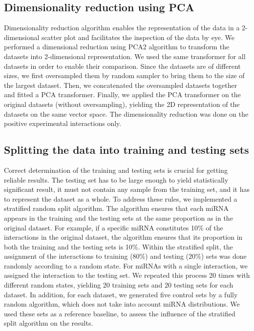 \documentclass{bmcart}
\begin{document}
\subsection*{Dimensionality reduction using PCA}
Dimensionality reduction algorithm enables the representation of the data in a 2-dimensional scatter plot and facilitates the inspection of the data by eye. We performed a dimensional reduction using PCA2 algorithm to transform the datasets into 2-dimensional representation. 
We used the same transformer for all datasets in order to enable their comparison. 
Since the datasets are of different sizes, we first oversampled them by random sampler to bring them to the size of the largest dataset. Then, we concatenated the oversampled datasets together and fitted a PCA transformer. Finally, we applied the PCA transformer on the original datasets (without oversampling), yielding the 2D representation of the datasets on the same vector space. 
The dimensionality reduction was done on the positive experimental interactions only.

\subsection*{Splitting the data into training and testing sets} \label{method:split}
Correct determination of the training and testing sets is crucial for getting reliable results. The testing set has to be large enough to yield statistically significant result, it must not contain any sample from the training set, and it has to represent the dataset as a whole. 
To address these rules, we implemented a stratified random split algorithm. The algorithm ensures that each miRNA appears in the training and the testing sets at the same proportion as in the original dataset. For example, if a specific miRNA constitutes 10\% of the interactions in the original dataset, the algorithm ensures that its proportion in both the training and the testing sets is 10\%. Within the stratified split, the assignment of the interactions to training (80\%) and testing (20\%) sets was done randomly according to a random state. For miRNAs with a single interaction, we assigned the interaction to the testing set.
We repeated this process 20 times with different random states, yielding 20 training sets and 20 testing sets for each dataset. 
In addition, for each dataset, we generated five control sets by a fully random algorithm, which does not take into account miRNA distributions. We used these sets as a reference baseline, to assess the influence of the stratified split algorithm on the results.
\end{document}

